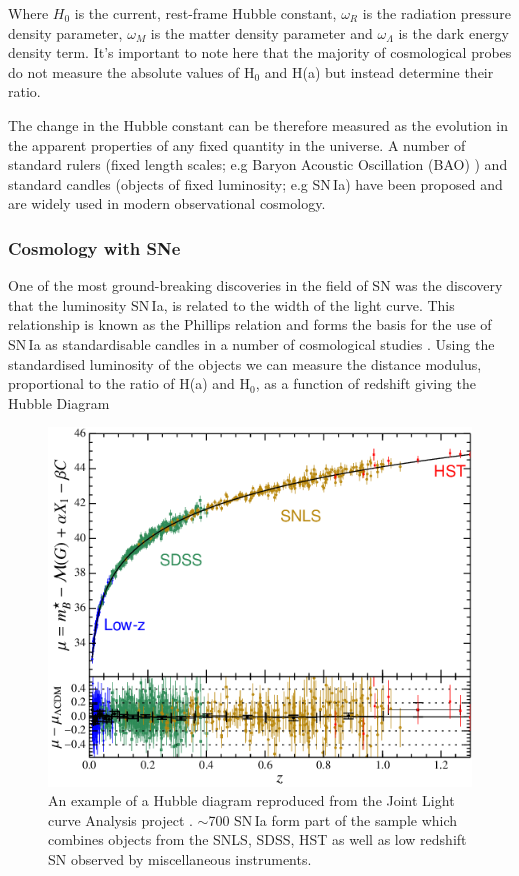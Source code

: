 \noindent Where $H_0$ is the current, rest-frame Hubble constant, $\omega_{R}$ is the radiation pressure density parameter, $\omega_{M}$ is the matter density parameter and $\omega_{\Lambda}$ is the dark energy density term. It's important to note here that the majority of cosmological probes do not measure the absolute values of H$_{0}$ and H(a) but instead determine their ratio.

The change in the Hubble constant can be therefore measured as the evolution in the apparent properties of any fixed quantity in the universe. A number of standard rulers (fixed length scales; e.g Baryon Acoustic Oscillation (BAO) \citep{Cole2005,Eisenstein2005}) and standard candles (objects of fixed luminosity; e.g SN\,Ia) have been proposed and are widely used in modern observational cosmology.

\subsubsection{Cosmology with SNe}
One of the most ground-breaking discoveries in the field of SN was the discovery that the luminosity SN\,Ia, is related to the width of the light curve. This relationship is known as the Phillips relation \citep{Phillips1993} and forms the basis for the use of SN\,Ia as standardisable candles in a number of cosmological studies \citep{Perlmutter1999,Riess1998,Astier2005,Betoule2014}. Using the standardised luminosity of the objects we can measure the distance modulus, proportional to the ratio of H(a) and H$_0$, as a function of redshift giving the Hubble Diagram \citep[;][]{Betoule2014}

\begin{figure}
  \includegraphics[width=\textwidth]{Figures/Chapter1/Betoule14Hubble.png}
  \caption{An example of a Hubble diagram reproduced from the Joint Light curve Analysis project \citep{Betoule2014}. $\sim$700 SN\,Ia form part of the sample which combines objects from the SNLS, SDSS, HST  as well as low redshift SN observed by miscellaneous instruments.}
  \label{fig:Betoule14Hubble}
\end{figure}

